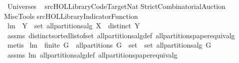 %
\begin{isabellebody}%
\def\isabellecontext{Universes}%
%
\isamarkuptrue%
%
\isadelimtheory
%
\endisadelimtheory
%
\isatagtheory
{}\isamarkupfalse%
\ Universes\isanewline
\isanewline
{}\ \isanewline
{\isachardoublequoteopen}{\isachartilde}{\isachartilde}{\isacharslash}src{\isacharslash}HOL{\isacharslash}Library{\isacharslash}Code{\isacharunderscore}Target{\isacharunderscore}Nat{\isachardoublequoteclose}\isanewline
StrictCombinatorialAuction\ \isanewline
MiscTools\isanewline
{\isachardoublequoteopen}{\isachartilde}{\isachartilde}{\isacharslash}src{\isacharslash}HOL{\isacharslash}Library{\isacharslash}Indicator{\isacharunderscore}Function{\isachardoublequoteclose}\isanewline
\isanewline
{}%
\endisatagtheory
{\isafoldtheory}%
%
\isadelimtheory
%
\endisadelimtheory
%
\isamarkuptrue%
\isamarkupfalse%
\ lm{}{}{\isacharcolon}\ \ {\isachardoublequoteopen}Y\ {\isasymin}\ set\ {\isacharparenleft}all{\isacharunderscore}partitions{\isacharunderscore}alg\ X{\isacharparenright}{\isachardoublequoteclose}\ \ {\isachardoublequoteopen}distinct\ Y{\isachardoublequoteclose}\isanewline
%
\isadelimproof
%
\endisadelimproof
%
\isatagproof
{}\isamarkupfalse%
\ assms\ distinct{\isacharunderscore}sorted{\isacharunderscore}list{\isacharunderscore}of{\isacharunderscore}set\ all{\isacharunderscore}partitions{\isacharunderscore}alg{\isacharunderscore}def\ all{\isacharunderscore}partitions{\isacharunderscore}paper{\isacharunderscore}equiv{\isacharunderscore}alg{\isacharprime}\isanewline
{}\isamarkupfalse%
\ metis%
\endisatagproof
{\isafoldproof}%
%
\isadelimproof
\isanewline
%
\endisadelimproof
\isanewline
{}\isamarkupfalse%
\ lm{}{}{\isacharcolon}\ \ {\isachardoublequoteopen}finite\ G{\isachardoublequoteclose}\ \ {\isachardoublequoteopen}all{\isacharunderscore}partitions\ G\ {\isacharequal}\ set\ {\isacharbackquote}\ {\isacharparenleft}set\ {\isacharparenleft}all{\isacharunderscore}partitions{\isacharunderscore}alg\ G{\isacharparenright}{\isacharparenright}{\isachardoublequoteclose}\isanewline
%
\isadelimproof
%
\endisadelimproof
%
\isatagproof
{}\isamarkupfalse%
\ assms\ lm{}{}\ all{\isacharunderscore}partitions{\isacharunderscore}alg{\isacharunderscore}def\ all{\isacharunderscore}partitions{\isacharunderscore}paper{\isacharunderscore}equiv{\isacharunderscore}alg\isanewline

\end{isabellebody}
